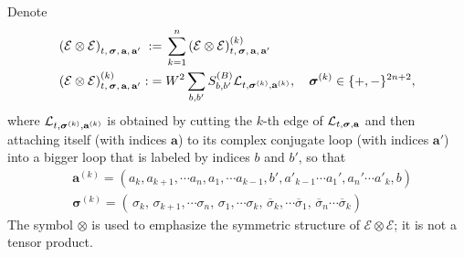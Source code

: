  
\begin{definition}\label{def:CALE} 
Denote 
  \begin{align}\label{defEOTE}
 \left( \mathcal{E}\otimes  \mathcal{E} \right)_{t, \,\boldsymbol{\sigma}, \,\textbf{a}, \,\textbf{a}'} \; := \; &
 \sum_{k=1}^n\left( \mathcal{E}\otimes  \mathcal{E} \right)^{(k)}_{t, \,\boldsymbol{\sigma}, \,\textbf{a}, \,\textbf{a}'}
 \nonumber \\
 \left( \mathcal{E}\otimes  \mathcal{E} \right)^{(k)}_{t, \,\boldsymbol{\sigma}, \,\textbf{a}, \,\textbf{a}'} :
\; = \; & W^{2} \sum_{b,b'} S^{(B)}_{b,b'}{\cal L}_{t, \boldsymbol{\sigma}^{(k ) },\textbf{a}^{(k )}},\quad \boldsymbol{\sigma}^{(k ) }\in \{+,-\}^{2n+2}, 
\end{align}
where ${\cal L}_{t, \boldsymbol{\sigma}^{(k ) },\textbf{a}^{(k )}}$ is obtained by cutting the $k$-th edge of ${\cal L}_{t,\boldsymbol{\sigma},\textbf{a}}$ and then attaching itself (with indices $\textbf{a}$) to its complex conjugate loop (with indices $\textbf{a}'$) into a bigger loop that is labeled by indices $b$ and $b'$, so that
\begin{align}\label{def_diffakn_k}
   & \textbf{a}^{(k )}=( a_k,a_{k+1},\cdots a_n, a_1,\cdots a_{k-1}, b', a'_{k-1}\cdots a_1', a_n'\cdots a'_{k},b)
    \nonumber \\
  &  \boldsymbol{\sigma}^{(k )}=( \, \sigma_k, \, \sigma_{k+1},\cdots \sigma_n,  \, \sigma_1,\cdots \sigma_{k}, \,  \overline\sigma_{k},  \cdots \overline\sigma_1 , \,  \overline\sigma_n \cdots \overline\sigma_{k })
\end{align}
The symbol $\otimes$ is used to emphasize the symmetric structure of $\mathcal{E} \otimes \mathcal{E}$; it is not a tensor product.  


 
 

\begin{figure}[ht]
\centering
\begin{minipage}{0.45\textwidth} %
    \centering
\end{minipage}
\end{figure}
\end{definition}
